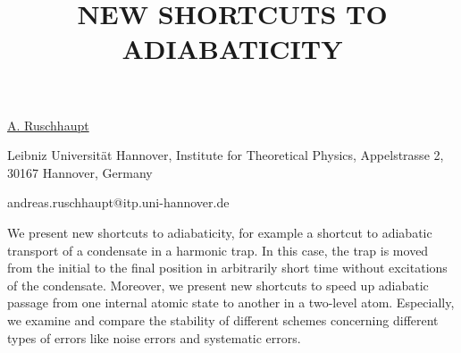 \title{NEW SHORTCUTS TO ADIABATICITY}

\underline{A. Ruschhaupt} 

{\normalsize{\vspace{-4mm}
Leibniz Universit\"{a}t Hannover, Institute for Theoretical Physics,
Appelstrasse 2, 30167 Hannover, Germany

\email andreas.ruschhaupt@itp.uni-hannover.de}}

We present new shortcuts to adiabaticity, for example a shortcut to adiabatic transport of a
condensate in a harmonic trap. In this case, the trap is moved from the initial to the final
position in arbitrarily short time without excitations of the condensate. Moreover, we present new
shortcuts to speed up adiabatic passage from one internal atomic state to another in a two-level
atom. Especially, we examine and compare the stability of different schemes concerning different
types of errors like noise errors and systematic errors.

\vspace{\baselineskip} 